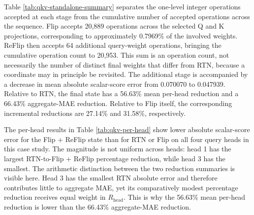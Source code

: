 \documentclass[../main.tex]{subfiles}
\begin{document}
Table \ref{tab:qkv-standalone-summary} separates the one-level integer operations accepted at each stage from the cumulative number of accepted operations across the sequence. Flip accepts 20,889 operations across the selected Q and K projections, corresponding to approximately 0.7969\% of the involved weights. ReFlip then accepts 64 additional query-weight operations, bringing the cumulative operation count to 20,953. This sum is an operation count, not necessarily the number of distinct final weights that differ from RTN, because a coordinate may in principle be revisited. The additional stage is accompanied by a decrease in mean absolute scalar-score error from 0.070070 to 0.047939. Relative to RTN, the final state has a 56.63\% mean per-head reduction and a 66.43\% aggregate-MAE reduction. Relative to Flip itself, the corresponding incremental reductions are 27.14\% and 31.58\%, respectively.

\begin{table}[H]
\centering
\caption[Per-head scalar Q--K surrogate errors]{Per-head scalar Q--K surrogate errors in the standalone case study.}
\label{tab:qkv-per-head}
\setlength{\tabcolsep}{5pt}
\renewcommand{\arraystretch}{1.15}
\end{table}

The per-head results in Table \ref{tab:qkv-per-head} show lower absolute scalar-score error for the Flip + ReFlip state than for RTN or Flip on all four query heads in this case study. The magnitude is not uniform across heads: head 1 has the largest RTN-to-Flip + ReFlip percentage reduction, while head 3 has the smallest. The arithmetic distinction between the two reduction summaries is visible here. Head 3 has the smallest RTN absolute error and therefore contributes little to aggregate MAE, yet its comparatively modest percentage reduction receives equal weight in $R_{\mathrm{head}}$. This is why the 56.63\% mean per-head reduction is lower than the 66.43\% aggregate-MAE reduction.
\end{document}
